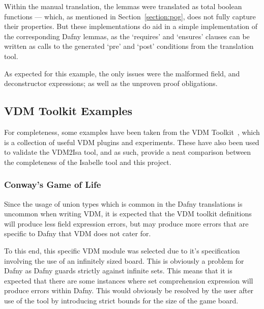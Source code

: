 \documentclass{entcs}
\newcommand{\lfcomment}[1]{\ifthenelse { \boolean{showComments} } {\textcolor{red}{LF:~#1}} { } } %
\begin{document}
Within the manual translation, the lemmas were translated as total boolean functions --- which, as mentioned in Section~\ref{section:pog}, does not fully capture their properties. But these implementations do aid in a simple implementation of the corresponding Dafny lemmas, as the `requires' and `ensures' clauses can be written as calls to the generated `pre' and `post' conditions from the translation tool.

As expected for this example, the only issues were the malformed field, and deconstructor expressions; as well as the unproven proof obligations.

\subsection{VDM Toolkit Examples}

For completeness, some examples have been taken from the VDM Toolkit~\cite{VDMToolkit}, which is a collection of useful VDM plugins and experiments. These have also been used to validate the VDM2Isa tool, and as such, provide a neat comparison between the completeness of the Isabelle tool and this project.


\subsubsection{Conway's Game of Life}\label{section:conway}

Since the usage of union types which is common in the Dafny translations is uncommon when writing VDM, it is expected that the VDM toolkit definitions will produce less field expression errors, but may produce more errors that are specific to Dafny that VDM does not cater for. 

To this end, this specific VDM module was selected due to it's specification involving the use of an infinitely sized board. This is obviously a problem for Dafny as Dafny guards strictly against infinite sets. This means that it is expected that there are some instances where set comprehension expression will produce errors within Dafny. This would obviously be resolved by the user after use of the tool by introducing strict bounds for the size of the game board.
\end{document}
